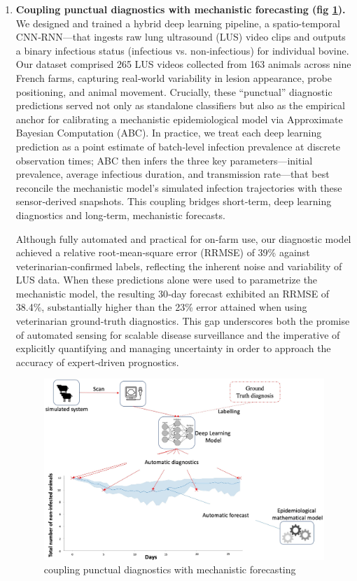 \begin{enumerate}
    \item \textbf{Coupling punctual diagnostics with mechanistic forecasting (fig \ref{fig:chap4-method1}).}   We designed and trained a hybrid deep learning pipeline, a spatio-temporal CNN‑RNN—that ingests raw lung ultrasound (LUS) video clips and outputs a binary infectious status (infectious vs. non‑infectious) for individual bovine. Our dataset comprised 265 LUS videos collected from 163 animals across nine French farms, capturing real‑world variability in lesion appearance, probe positioning, and animal movement.  Crucially, these “punctual” diagnostic predictions served not only as standalone classifiers but also as the empirical anchor for calibrating a mechanistic epidemiological model via Approximate Bayesian Computation (ABC). In practice, we treat each deep learning prediction as a point estimate of batch‑level infection prevalence at discrete observation times; ABC then infers the three key parameters—initial prevalence, average infectious duration, and transmission rate—that best reconcile the mechanistic model’s simulated infection trajectories with these sensor‑derived snapshots. This coupling bridges short‑term, deep learning diagnostics and long‑term, mechanistic forecasts. 

    Although fully automated and practical for on‑farm use, our diagnostic model achieved a relative root‑mean‑square error (RRMSE) of 39\% against veterinarian‑confirmed labels, reflecting the inherent noise and variability of LUS data. When these predictions alone were used to parametrize the mechanistic model, the resulting 30‑day forecast exhibited an RRMSE of 38.4\%, substantially higher than the 23\% error attained when using veterinarian ground‑truth diagnostics. This gap underscores both the promise of automated sensing for scalable disease surveillance and the imperative of explicitly quantifying and managing uncertainty in order to approach the accuracy of expert‑driven prognostics.

    \begin{figure}[H]
      \includegraphics[width=\linewidth]{figures/chap4/method 1.jpg}
      \caption{coupling punctual diagnostics with mechanistic forecasting}
      \label{fig:chap4-method1}
    \end{figure}


\end{enumerate}
